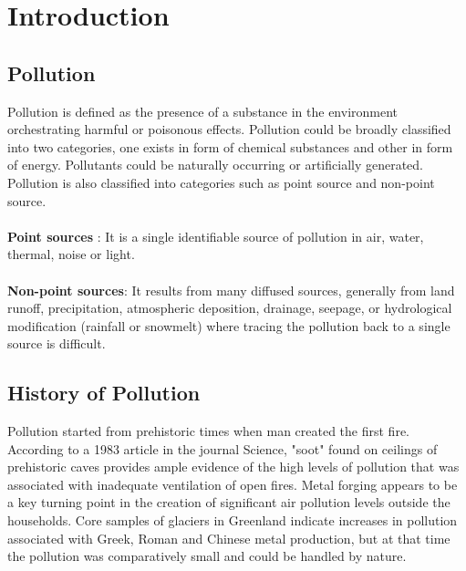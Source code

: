 \chapter{Introduction} %

\label{Chapter1} %




\section{Pollution}

Pollution is defined as the presence of a substance in the environment orchestrating harmful or poisonous effects. Pollution could be broadly classified into two categories, one exists in form of chemical substances and other in form of energy. Pollutants could be naturally occurring or artificially generated. Pollution is also classified into categories such as point source and non-point source.
\\
\\
\textbf{Point sources} : It is a single identifiable source of pollution in air, water, thermal, noise or light. 
\\
\\
\textbf{Non-point sources}: It results from many diffused sources, generally from land runoff, precipitation, atmospheric deposition, drainage, seepage, or hydrological modification (rainfall or snowmelt) where tracing the pollution back to a single source is difficult.

\section{History of Pollution}
Pollution started from prehistoric times when man created the first fire. According to a 1983 article in the journal Science, "soot" found on ceilings of prehistoric caves provides ample evidence of the high levels of pollution that was associated with inadequate ventilation of open fires. Metal forging appears to be a key turning point in the creation of significant air pollution levels outside the households. Core samples of glaciers in Greenland indicate increases in pollution associated with Greek, Roman and Chinese metal production, but at that time the pollution was comparatively small and could be handled by nature. 

